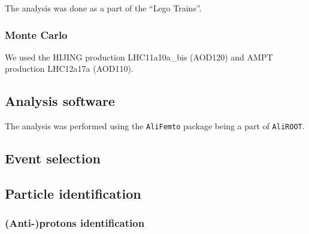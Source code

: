 
The analysis was done as a part of the ``Lego Trains''.

\subsubsection{Monte Carlo}
We used the HIJING production LHC11a10a\_bis (AOD120) and AMPT production LHC12a17a (AOD110).
\subsection{Analysis software}
The analysis was performed using the \verb|AliFemto| package being a part of \verb|AliROOT|.%


\subsection{Event selection}


\subsection{Particle identification}
\subsubsection{(Anti-)protons identification}
